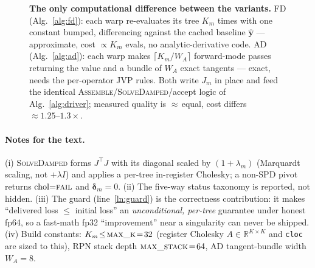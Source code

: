 \documentclass[11pt]{article}
\newcommand{\yhat}{\hat{\mathbf{y}}}
\begin{document}
\begin{figure}[H]
\begin{minipage}{0.95\textwidth}
\textbf{The only computational difference between the variants.}
FD (Alg.~\ref{alg:fd}): each warp re-evaluates its tree $K_m$ times with one constant
bumped, differencing against the cached baseline $\yhat$ --- approximate, cost
$\propto K_m$ evals, no analytic-derivative code. AD (Alg.~\ref{alg:ad}): each warp makes
$\lceil K_m/W_{\!A}\rceil$ forward-mode passes returning the value and a bundle of
$W_{\!A}$ exact tangents --- exact, needs the per-operator JVP rules. Both write $J_m$ in
place and feed the identical \textsc{Assemble}/\textsc{SolveDamped}/accept logic of
Alg.~\ref{alg:driver}; measured quality is $\approx$\,equal, cost differs
$\approx 1.25\text{--}1.3\times$.
\end{minipage}
\end{figure}

\paragraph{Notes for the text.}
(i) \textsc{SolveDamped} forms $J^{\!\top}\!J$ with its diagonal scaled by $(1{+}\lambda_m)$
(Marquardt scaling, not $+\lambda I$) and applies a per-tree in-register Cholesky;
a non-SPD pivot returns $\mathrm{chol}{=}\textsc{fail}$ and $\boldsymbol{\delta}_m{=}0$.
(ii) The five-way status taxonomy is reported, not hidden.
(iii) The guard (line~\ref{ln:guard}) is the correctness contribution: it makes
``delivered loss $\le$ initial loss'' an \emph{unconditional, per-tree} guarantee under
honest fp64, so a fast-math fp32 ``improvement'' near a singularity can never be shipped.
(iv) Build constants: $K_m\!\le\!\textsc{max\_k}\!=\!32$ (register Cholesky $A\!\in\!\mathbb{R}^{K\times K}$
and \texttt{cloc} are sized to this), RPN stack depth $\textsc{max\_stack}\!=\!64$, AD
tangent-bundle width $W_{\!A}\!=\!8$.
\end{document}
